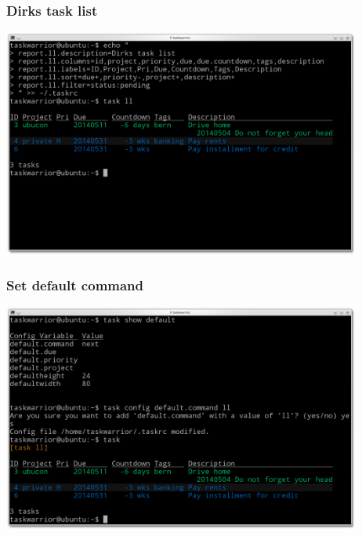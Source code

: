 \documentclass[t,handout]{beamer}
\begin{document}
\begin{frame}[fragile]\frametitle{Dirks task list}
\begin{center} %
\includegraphics[width=11.8cm,height=7.5cm]{dirks-task-list.png}
\end{center}
\end{frame}

\begin{frame}[fragile]\frametitle{Set default command}
\begin{center} %
\includegraphics[width=11.8cm,height=7.5cm]{set-default-command.png}
\end{center}
\end{frame}
\end{document}
